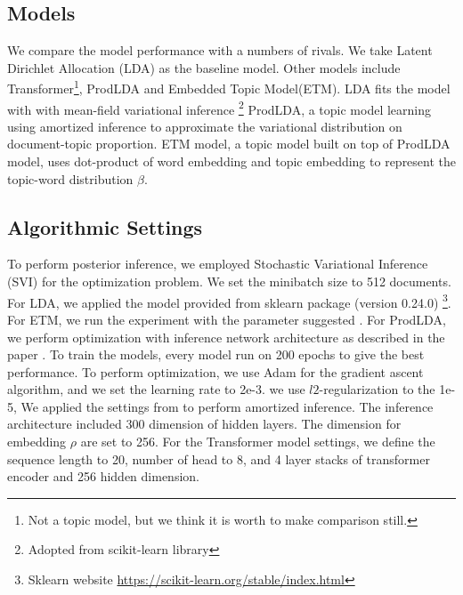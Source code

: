 \subsection{Models}\label{ch4:result_model}
We compare the model performance with a numbers of rivals. We take Latent Dirichlet Allocation (LDA)\cite{blei_latent_2003} as the baseline model. Other models include Transformer\cite{vaswani_attention_nodate}\footnote{Not a topic model, but we think it is worth to make comparison still.},  ProdLDA\cite{srivastava_autoencoding_2017} and Embedded Topic Model(ETM)\cite{dieng_topic_2019}.
LDA fits the model with with mean-field variational inference \footnote{Adopted from \textmd{scikit-learn} library}
ProdLDA, a topic model learning using amortized inference to approximate the variational distribution on document-topic proportion.
ETM model, a topic model built on top of ProdLDA model, uses dot-product of word embedding and topic embedding to represent the topic-word distribution $ \beta $.
\subsection{Algorithmic Settings}
To perform posterior inference, we employed Stochastic Variational Inference (SVI) \cite{hoffman_stochastic_2013} for the optimization problem. We set the minibatch size to 512 documents.
For LDA, we applied the model provided from sklearn package (version 0.24.0) \footnote{Sklearn website \url{https://scikit-learn.org/stable/index.html}}. For ETM, we run the experiment with the parameter suggested \cite{dieng_topic_2019}. For ProdLDA, we perform optimization with inference network architecture as described in the paper \cite{srivastava_autoencoding_2017}. 
To train the models, every model run on 200 epochs to give the best performance. 
To perform optimization, we use Adam for the gradient ascent algorithm, and we set the learning rate to 2e-3.
we use $ l2 $-regularization to the 1e-5,
We applied the settings from \cite{srivastava_autoencoding_2017} to perform amortized inference. The inference architecture included 300 dimension of hidden layers. 
The dimension for embedding $ \rho $ are set to 256.
For the Transformer model settings, we define the sequence length to 20, number of head to 8, and 4 layer stacks of transformer encoder and 256 hidden dimension.
